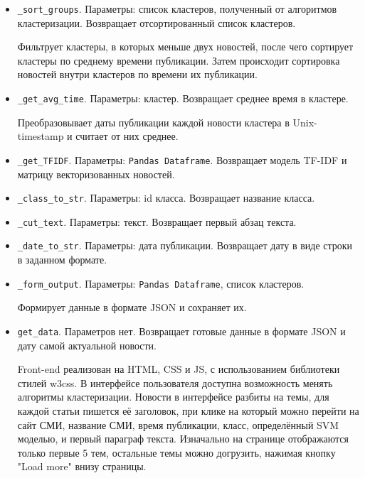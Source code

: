 \begin{itemize}
    \item \verb|_sort_groups|. Параметры: список кластеров, полученный от
    алгоритмов кластеризации. Возвращает отсортированный список кластеров.

    Фильтрует кластеры, в которых меньше двух новостей, после чего сортирует кластеры по среднему времени публикации.
    Затем происходит сортировка новостей внутри кластеров по времени их публикации.

    \item \verb|_get_avg_time|. Параметры: кластер. Возвращает среднее время
    в кластере.

    Преобразовывает даты публикации каждой новости кластера в Unix-timestamp и
    считает от них среднее.

    \item \verb|_get_TFIDF|. Параметры: \verb|Pandas Dataframe|.
    Возвращает модель TF-IDF и матрицу векторизованных новостей.

    \item \verb|_class_to_str|. Параметры: id класса.
    Возвращает название класса.

    \item \verb|_cut_text|. Параметры: текст.
    Возвращает первый абзац текста.

    \item \verb|_date_to_str|. Параметры: дата публикации.
    Возвращает дату в виде строки в заданном формате.

    \item \verb|_form_output|. Параметры: \verb|Pandas Dataframe|, список
    кластеров.

    Формирует данные в формате JSON и сохраняет их.

    \item \verb|get_data|. Параметров нет.
    Возвращает готовые данные в формате JSON и дату самой актуальной новости.

Front-end реализован на HTML, CSS и JS, с использованием библиотеки стилей w3css. 
В интерфейсе пользователя доступна возможность менять алгоритмы кластеризации. Новости в интерфейсе
разбиты на темы, для каждой статьи пишется её заголовок, при клике на который можно
перейти на сайт СМИ, название СМИ, время публикации, класс, определённый SVM моделью,
и первый параграф текста. Изначально на странице отображаются только первые 5 тем,
остальные темы можно догрузить, нажимая кнопку "Load more" внизу страницы.
\end{itemize}
